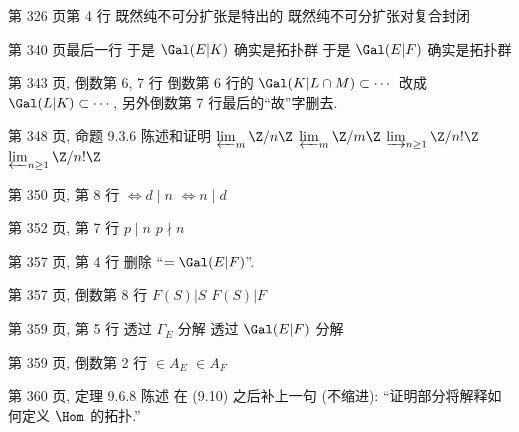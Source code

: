 \documentclass{AJerrata}
\begin{document}
\begin{Errata}
        \item[第 326 页第 4 行]
        \Orig 既然纯不可分扩张是特出的
        \Corr 既然纯不可分扩张对复合封闭
        
        \item[第 340 页最后一行]
        \Orig 于是 $\Gal(E|K)$ 确实是拓扑群
        \Corr 于是 $\Gal(E|F)$ 确实是拓扑群
        
        \item[第 343 页, 倒数第 6, 7 行]
        倒数第 6 行的 $\Gal(K | L \cap M) \subset \cdots$ 改成 $\Gal(L|K) \subset \cdots$, 另外倒数第 7 行最后的``故''字删去.
        
   		\item[第 348 页, 命题 9.3.6 陈述和证明]
        \Orig $\varprojlim_m \Z/n\Z$
        \Corr $\varprojlim_m \Z/m\Z$
        \newline
        \Orig $\varinjlim_{n \geq 1} \Z/n!\Z$
        \Corr $\varprojlim_{n \geq 1} \Z/n!\Z$
        
        \item[第 350 页, 第 8 行]
        \Orig $\iff d \mid n$
        \Corr $\iff n \mid d$
        
   		\item[第 352 页, 第 7 行]
        \Orig $p \mid n$
        \Corr $p \nmid n$
        
        \item[第 357 页, 第 4 行]
        删除 ``$= \Gal(E|F)$''.
        
        \item[第 357 页, 倒数第 8 行]
        \Orig $F(S)|S$
        \Corr $F(S)|F$
        
        \item[第 359 页, 第 5 行]
        \Orig 透过 $\Gamma_E$ 分解
        \Corr 透过 $\Gal(E|F)$ 分解
        
        \item[第 359 页, 倒数第 2 行]
        \Orig $\in A_E$
        \Corr $\in A_F$
        
        \item[第 360 页, 定理 9.6.8 陈述]
        在 (9.10) 之后补上一句 (不缩进): ``证明部分将解释如何定义 $\Hom$ 的拓扑.'' 
        

\end{Errata}
\end{document}
